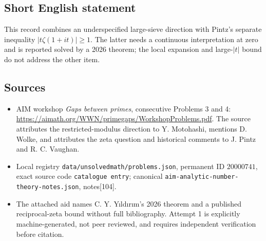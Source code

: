 \documentclass[11pt]{article}
\begin{document}
\subsection{Short English statement}
This record combines an underspecified large-sieve direction with Pintz's separate inequality \(|t\zeta(1+it)|\geq1\). The latter needs a continuous interpretation at zero and is reported solved by a 2026 theorem; the local expansion and large-\(|t|\) bound do not address the other item.
\subsection{Sources}
\begin{itemize}
\item AIM workshop \emph{Gaps between primes}, consecutive Problems 3 and 4: \url{https://aimath.org/WWN/primegaps/WorkshopProblems.pdf}. The source attributes the restricted-modulus direction to Y. Motohashi, mentions D. Wolke, and attributes the zeta question and historical comments to J. Pintz and R. C. Vaughan.
\item Local registry \texttt{data/unsolvedmath/problems.json}, permanent ID \(20000741\), exact source code \texttt{catalogue entry}; canonical \texttt{aim-analytic-number-theory-notes.json}, notes[104].
\item The attached aid names C. Y. Yıldırım's 2026 theorem and a published reciprocal-zeta bound without full bibliography. Attempt 1 is explicitly machine-generated, not peer reviewed, and requires independent verification before citation.
\end{itemize}
\end{document}
